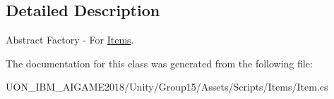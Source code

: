 \subsection{Detailed Description}
Abstract Factory -\/ For \mbox{\hyperlink{class_items}{Items}}. 

The documentation for this class was generated from the following file\+:\begin{DoxyCompactItemize}
\item 
U\+O\+N\+\_\+\+I\+B\+M\+\_\+\+A\+I\+G\+A\+M\+E2018/\+Unity/\+Group15/\+Assets/\+Scripts/\+Items/Item.\+cs\end{DoxyCompactItemize}
